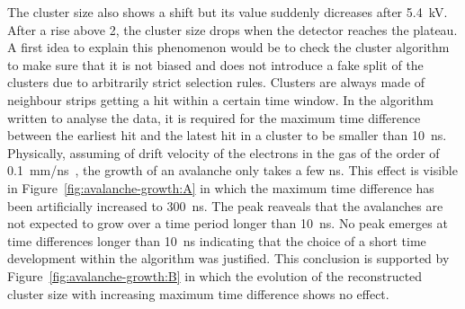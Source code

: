     The cluster size also shows a shift but its value suddenly dicreases after \SI{5.4}{kV}. After a rise above 2, the cluster size drops when the detector reaches the plateau. A first idea to explain this phenomenon would be to check the cluster algorithm to make sure that it is not biased and does not introduce a fake split of the clusters due to arbitrarily strict selection rules. Clusters are always made of neighbour strips getting a hit within a certain time window. In the algorithm written to analyse the data, it is required for the maximum time difference between the earliest hit and the latest hit in a cluster to be smaller than \SI{10}{ns}. Physically, assuming of drift velocity of the electrons in the gas of the order of \SI{0.1}{mm/ns}~\cite{DEURQUIJO2009}, the growth of an avalanche only takes a few \si{ns}. This effect is visible in Figure~\ref{fig:avalanche-growth:A} in which the maximum time difference has been artificially increased to \SI{300}{ns}. The peak reaveals that the avalanches are not expected to grow over a time period longer than \SI{10}{ns}. No peak emerges at time differences longer than \SI{10}{ns} indicating that the choice of a short time development within the algorithm was justified. This conclusion is supported by Figure~\ref{fig:avalanche-growth:B} in which the evolution of the reconstructed cluster size with increasing maximum time difference shows no effect.
	
